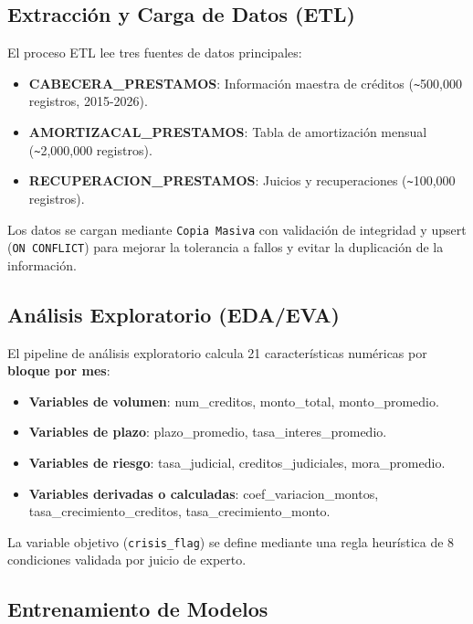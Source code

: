 \subsection{Extracción y Carga de Datos (ETL)}

El proceso ETL lee tres fuentes de datos principales:

\begin{itemize}
    \item \textbf{CABECERA\_PRESTAMOS}: Información maestra de créditos (\verb|~|500,000 registros, 2015-2026).
    \item \textbf{AMORTIZACAL\_PRESTAMOS}: Tabla de amortización mensual (\verb|~|2,000,000 registros).
    \item \textbf{RECUPERACION\_PRESTAMOS}: Juicios y recuperaciones (\verb|~|100,000 registros).
\end{itemize}

Los datos se cargan mediante \texttt{Copia Masiva}  con validación de integridad y upsert (\texttt{ON CONFLICT}) para mejorar la tolerancia a fallos y evitar la duplicación de la información.

\subsection{Análisis Exploratorio (EDA/EVA)}

El pipeline de análisis exploratorio calcula 21 características numéricas por \textbf{bloque por mes}:

\begin{itemize}
    \item \textbf{Variables de volumen}: num\_creditos, monto\_total, monto\_promedio.
    \item \textbf{Variables de plazo}: plazo\_promedio, tasa\_interes\_promedio.
    \item \textbf{Variables de riesgo}: tasa\_judicial, creditos\_judiciales, mora\_promedio.
    \item \textbf{Variables derivadas o calculadas}: coef\_variacion\_montos, tasa\_crecimiento\_creditos, tasa\_crecimiento\_monto.
\end{itemize}

La variable objetivo (\texttt{crisis\_flag}) se define mediante una regla heurística de 8 condiciones validada por juicio de experto.

\subsection{Entrenamiento de Modelos}

